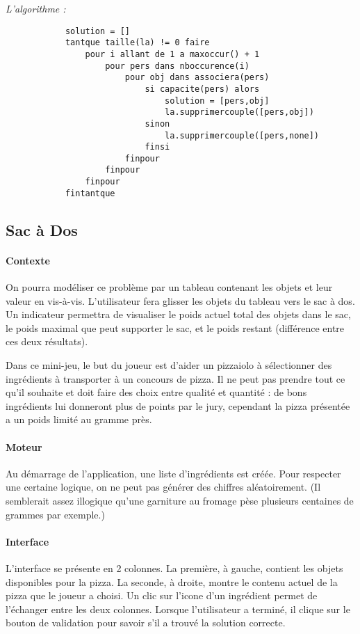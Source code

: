 			\emph{L'algorithme :}

			\begin{lstlisting}
			solution = []
			tantque taille(la) != 0 faire
				pour i allant de 1 a maxoccur() + 1
					pour pers dans nboccurence(i)
						pour obj dans associera(pers)
							si capacite(pers) alors
								solution = [pers,obj]
								la.supprimercouple([pers,obj])
							sinon
								la.supprimercouple([pers,none])
							finsi
						finpour
					finpour
				finpour
			fintantque
			\end{lstlisting}





    \subsection{Sac à Dos}
        \paragraph{Contexte}
        On pourra modéliser ce problème par un tableau contenant les objets et leur
        valeur en vis-à-vis. L'utilisateur fera glisser les objets du tableau vers
        le sac à dos. Un indicateur permettra de visualiser le poids actuel total
        des objets dans le sac, le poids maximal que peut supporter le sac, et le
        poids restant (différence entre ces deux résultats).

            Dans ce mini-jeu, le but du joueur est d'aider un pizzaiolo à
            sélectionner des ingrédients à transporter à un concours de pizza.
            Il ne peut pas prendre tout ce qu'il souhaite et doit faire des
            choix entre qualité et quantité : de bons ingrédients lui donneront
            plus de points par le jury, cependant la pizza présentée a un poids
            limité au gramme près.
        \paragraph{Moteur}
            Au démarrage de l'application, une liste d'ingrédients est créée.
            Pour respecter une certaine logique, on ne peut pas générer des
            chiffres aléatoirement. (Il semblerait assez illogique qu'une
            garniture au fromage pèse plusieurs centaines de grammes par
            exemple.)
        \paragraph{Interface}
            L'interface se présente en 2 colonnes. La première, à gauche,
            contient les objets disponibles pour la pizza. La seconde, à droite,
            montre le contenu actuel de la pizza que le joueur a choisi.
            Un clic sur l'icone d'un ingrédient permet de l'échanger entre
            les deux colonnes.
            Lorsque l'utilisateur a terminé, il clique sur le bouton de
            validation pour savoir s'il a trouvé la solution correcte.
